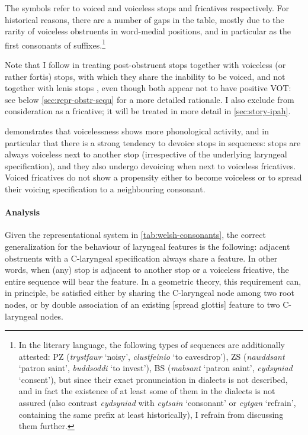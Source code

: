 \begin{table}[tbp]
\end{table} The symbols refer to voiced and voiceless stops and fricatives respectively. For historical reasons, there are a number of gaps in the table, mostly due to the rarity of voiceless obstruents in word-medial positions, and in particular as the first consonants of suffixes.\footnote{In the literary language, the following types of sequences are additionally attested: PZ (\emph{trystfawr} `noisy', \emph{clustfeinio} `to eavesdrop'), ZS (\emph{nawddsant} `patron saint', \emph{buddsoddi} `to invest'), BS (\emph{mabsant} `patron saint', \emph{cydsyniad} `consent'), but since their exact pronunciation in dialects is not described, and in fact the existence of at least some of them in the dialects is not assured (also contrast \emph{cydsyniad} with \emph{cytsain} `consonant' or \emph{cytgan} `refrain', containing the same prefix at least historically), I refrain from discussing them further.}

Note that I follow \citet{awbery86:_pembr_welsh} in treating post\hyp obstruent stops together with voiceless (or rather fortis) stops, with which they share the inability to be voiced, and not together with lenis stops \citep{thomas93:_tafod_nantg}, even though both appear not to have positive VOT: see below \cref{sec:repr-obstr-sequ} for a more detailed rationale. I also exclude \ipa{[h]} from consideration as a fricative; it will be treated in more detail in \cref{sec:story-ipah}.

 demonstrates that voicelessness shows more phonological activity, and in particular that there is a strong tendency to devoice stops in sequences: stops are always voiceless next to another stop (irrespective of the underlying laryngeal specification), and they also undergo devoicing when next to voiceless fricatives. Voiced fricatives do not show a propensity either to become voiceless or to spread their voicing specification to a neighbouring consonant.

\paragraph{Analysis}
\label{sec:analysis-15}

Given the representational system in \cref{tab:welsh-consonants}, the correct generalization for the behaviour of laryngeal features is the following: adjacent obstruents with a C-laryngeal specification always share a  feature. In other words, when (any) stop is adjacent to another stop or a voiceless fricative, the entire sequence will bear the  feature. In a geometric theory, this requirement can, in principle, be satisfied either by sharing the C-laryngeal node among two root nodes, or by double association of an existing [spread glottis] feature to two C-laryngeal nodes.

